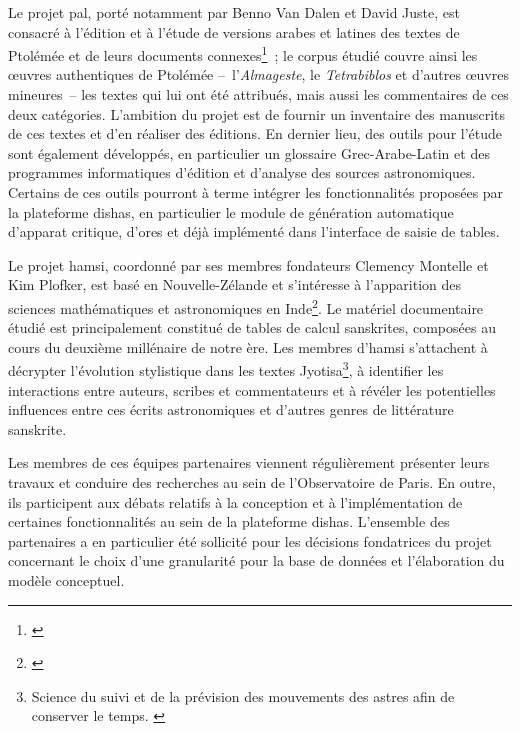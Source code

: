 \documentclass[a4paper,12pt,twoside]{book}
\newcommand{\dishas}{\gls{dishas}\xspace}
\newcommand{\hamsi}{\gls{hamsi}\xspace}
\newcommand{\pal}{\gls{pal}\xspace}
\begin{document}
Le projet \pal, porté notamment par Benno Van Dalen et David Juste, est consacré à l'édition et à l'étude de versions arabes et latines des textes de Ptolémée et de leurs documents connexes\footnote{\cite{PtolemaeusArabusLatinus}}~; le corpus étudié couvre ainsi les œuvres authentiques de Ptolémée –~l'\emph{Almageste}, le \emph{Tetrabiblos} et d'autres œuvres mineures~– les textes qui lui ont été attribués, mais aussi les commentaires de ces deux catégories. L'ambition du projet est de fournir un inventaire des manuscrits de ces textes et d'en réaliser des éditions. En dernier lieu, des outils pour l'étude sont également développés, en particulier un glossaire Grec-Arabe-Latin et des programmes informatiques d'édition et d'analyse des sources astronomiques. Certains de ces outils pourront à terme intégrer les fonctionnalités proposées par la plateforme \dishas, en particulier le module de génération automatique d'apparat critique, d'ores et déjà implémenté dans l'interface de saisie de tables.

Le projet \hamsi, coordonné par ses membres fondateurs Clemency Montelle et Kim Plofker, est basé en Nouvelle-Zélande et s'intéresse à l'apparition des sciences mathématiques et astronomiques en Inde\footnote{\cite{HistoryAstronomicalSciences}}. Le matériel documentaire étudié est principalement constitué de tables de calcul sanskrites, composées au cours du deuxième millénaire de notre ère. Les membres d'\hamsi s'attachent à décrypter l'évolution stylistique dans les textes Jyotisa\footnote{Science du suivi et de la prévision des mouvements des astres afin de conserver le temps. \cite[p.~353]{monier-williamsSanskritEnglishDictionary1872}}, à identifier les interactions entre auteurs, scribes et commentateurs et à révéler les potentielles influences entre ces écrits astronomiques et d'autres genres de littérature sanskrite.

Les membres de ces équipes partenaires viennent régulièrement présenter leurs travaux et conduire des recherches au sein de l'Observatoire de Paris. En outre, ils participent aux débats relatifs à la conception et à l'implémentation de certaines fonctionnalités au sein de la plateforme \dishas. L'ensemble des partenaires a en particulier été sollicité pour les décisions fondatrices du projet concernant le choix d'une granularité pour la base de données et l'élaboration du modèle conceptuel.
\end{document}
